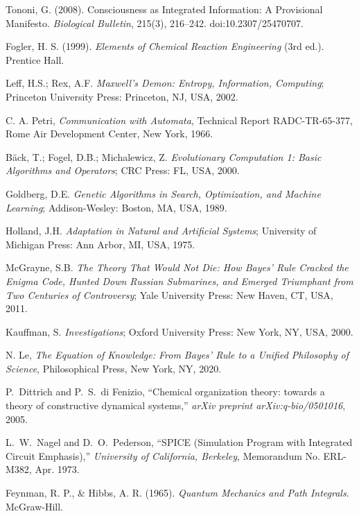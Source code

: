 \documentclass[preprint,12pt]{elsarticle}
\begin{document}
\begin{thebibliography}{999}
Tononi, G. (2008). Consciousness as Integrated Information: A Provisional Manifesto. \textit{Biological Bulletin}, 215(3), 216–242. doi:10.2307/25470707.

Fogler, H. S. (1999). \textit{Elements of Chemical Reaction Engineering} (3rd ed.). Prentice Hall.

Leff, H.S.; Rex, A.F. \textit{Maxwell’s Demon: Entropy, Information, Computing}; Princeton University Press: Princeton, NJ, USA, 2002.

 C. A. Petri, \textit{Communication with Automata}, Technical Report RADC-TR-65-377, Rome Air Development Center, New York, 1966.

Bäck, T.; Fogel, D.B.; Michalewicz, Z. \textit{Evolutionary Computation 1: Basic Algorithms and Operators}; CRC Press: FL, USA, 2000.

Goldberg, D.E. \textit{Genetic Algorithms in Search, Optimization, and Machine Learning}; Addison-Wesley: Boston, MA, USA, 1989.

Holland, J.H. \textit{Adaptation in Natural and Artificial Systems}; University of Michigan Press: Ann Arbor, MI, USA, 1975.

McGrayne, S.B. \textit{The Theory That Would Not Die: How Bayes' Rule Cracked the Enigma Code, Hunted Down Russian Submarines, and Emerged Triumphant from Two Centuries of Controversy}; Yale University Press: New Haven, CT, USA, 2011.

Kauffman, S. \textit{Investigations}; Oxford University Press: New York, NY, USA, 2000.

 N. Le, \textit{The Equation of Knowledge: From Bayes’ Rule to a Unified Philosophy of Science}, Philosophical Press, New York, NY, 2020.

P.~Dittrich and P.~S.~di Fenizio, ``Chemical organization theory: towards a theory of constructive dynamical systems,'' \emph{arXiv preprint arXiv:q-bio/0501016}, 2005.


L.~W.~Nagel and D.~O.~Pederson, ``SPICE (Simulation Program with Integrated Circuit Emphasis),'' 
{\em University of California, Berkeley}, Memorandum No. ERL-M382, Apr. 1973.

Feynman, R. P., \& Hibbs, A. R. (1965). \textit{Quantum Mechanics and Path Integrals}. McGraw-Hill.


\end{thebibliography}
\end{document}
